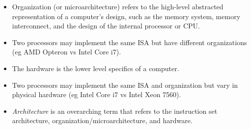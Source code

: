 \documentclass[11pt, a4paper]{article}
\theoremstyle{definition}
\theoremstyle{remark}
\begin{document}
\begin{itemize}
\begin{enumerate}
        \item Operations: Categories include data transfer, arithmetic logical, control, and floating point.
        \item Control flow operations: Nearly all ISAs support conditional branching, unconditional jumps, procedure calls, and returns. Address is relative to program counter (PC). 
        \item Encoding an ISA: fixed length (eg ARM and MIPS, all instructions are 32 bits long) or variable length (eg 80x86, instructions are 1-18 bytes long). Variable length binaries tend to be smaller as instructions can be packed together more.
    \end{enumerate}
    \item Organization (or microarchitecture) refers to the high-level abstracted representation of a computer's design, such as the memory system, memory interconnect, and the design of the internal processor or CPU. 
    \item Two processors may implement the same ISA but have different organizations (eg AMD Opteron vs Intel Core i7).
    \item The hardware is the lower level specifics of a computer. 
    \item Two processors may implement the same ISA and organization but vary in physical hardware (eg Intel Core i7 vs Intel Xeon 7560).
    \item \textit{Architecture} is an overarching term that refers to the instruction set architecture, organization/microarchitecture, and hardware.
\end{itemize}
\end{document}
